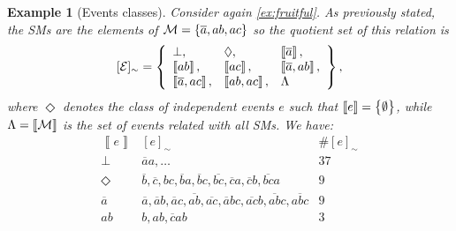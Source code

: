 \documentclass[a4paper]{article}
\newtheorem{example}{Example}
\newtheorem{example}{Example}
\newcommand{\cla}[1]{\ensuremath{{\cal #1}}}        %
\newcommand{\co}[1]{\ensuremath{\overline{#1}}}     %
\newcommand{\MODELset}{\ensuremath{\cla{M}}}
\newcommand{\EVENTSset}{\ensuremath{\cla{E}}}
\newcommand{\stablecore}[1]{\ensuremath{\left\llbracket #1 \right\rrbracket}}
\newcommand{\inconsistent}{\bot}
\newcommand{\bottomclass}{\ensuremath{\Lambda}}
\newcommand{\indepclass}{\ensuremath{\Diamond}}
\newcommand{\class}[1]{\ensuremath{[{#1}]_{\sim}}}
\begin{document}
\begin{example}[Events classes]\label{ex:classes}\em
  Consider again \cref{ex:fruitful}.  As previously stated, the
  \aclp{SM} are the elements of \(\MODELset = \set{\co{a}, ab, ac}\)
  so the quotient set of this relation is
    \begin{equation*}
        \class{\EVENTSset} = \set{
            \begin{array}{lll}
                \inconsistent,           &
                \indepclass,             &
                \stablecore{\co{a}},       \\
                \stablecore{ab},         &
                \stablecore{ac},         &
                \stablecore{\co{a}, ab},   \\
                \stablecore{\co{a}, ac}, &
                \stablecore{ab, ac},     &
                \bottomclass
            \end{array}
        },
    \end{equation*}
    where \(\indepclass\) denotes the class of \emph{independent
      events} \(e\) such that \(\stablecore{e} = \set{\emptyset}\),
    while \(\bottomclass = \stablecore{\MODELset}\) is the set of
    events related with all \acp{SM}.  We have:
    \begin{equation*}
        \begin{array}{l|lr}
            \stablecore{e}
             & \class{e}
             & \# \class{e}                                                                       \\
            \hline
            \inconsistent
             & \co{a}a, \ldots
             & 37                                                                                 \\
            \indepclass
             & \co{b}, \co{c}, bc, \co{b}a, \co{b}c, \co{bc}, \co{c}a, \co{c}b, \co{bc}a
             & 9                                                                                  \\
            \co{a}
             & \co{a}, \co{a}b, \co{a}c, \co{ab}, \co{ac}, \co{a}bc, \co{ac}b, \co{ab}c, \co{abc}
             & 9                                                                                  \\
            ab
             & b, ab, \co{c}ab
             & 3                                                                                  \\

\end{array}
\end{equation*}
\end{example}
\end{document}
